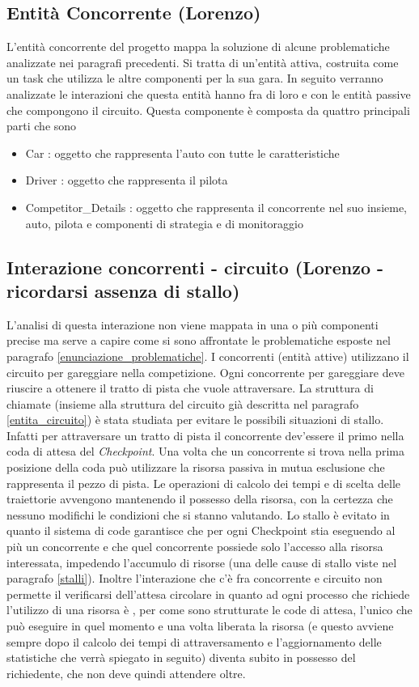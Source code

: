 \subsection{Entit\`{a} Concorrente (Lorenzo)}
L'entità concorrente del progetto mappa la soluzione di alcune problematiche analizzate nei paragrafi precedenti. Si tratta di un'entità attiva, costruita come un task che utilizza le altre componenti per la sua gara. In seguito verranno analizzate le interazioni che questa entità hanno fra di loro e con le entità passive che compongono il circuito.
Questa componente è composta da quattro principali parti che sono
\begin{itemize}
\item Car : oggetto che rappresenta l'auto con tutte le caratteristiche
\item Driver : oggetto che rappresenta il pilota
\item Competitor\_Details : oggetto che rappresenta il concorrente nel suo insieme, auto, pilota e componenti di strategia e di monitoraggio
\end{itemize}
\subsection{Interazione concorrenti - circuito (Lorenzo - ricordarsi assenza di stallo)}
L'analisi di questa interazione non viene mappata in una o più componenti precise ma serve a capire come si sono affrontate le problematiche esposte nel paragrafo \ref{enunciazione_problematiche}. I concorrenti (entità attive) utilizzano il circuito per gareggiare nella competizione.
Ogni concorrente per gareggiare deve riuscire a ottenere il tratto di pista che vuole attraversare. La struttura di chiamate (insieme alla struttura del circuito già descritta nel paragrafo \ref{entita_circuito}) è stata studiata per evitare le possibili situazioni di stallo. Infatti per attraversare un tratto di pista il concorrente dev'essere il primo nella coda di attesa del \emph{Checkpoint}. Una volta che un concorrente si trova nella prima posizione della coda può utilizzare la risorsa passiva in mutua esclusione che rappresenta il pezzo di pista. Le operazioni di calcolo dei tempi e di scelta delle traiettorie avvengono mantenendo il possesso della risorsa, con la certezza che nessuno modifichi le condizioni che si stanno valutando. Lo stallo è evitato in quanto il sistema di code garantisce che per ogni Checkpoint stia eseguendo al più un concorrente e che quel concorrente possiede solo l'accesso alla risorsa interessata, impedendo l'accumulo di risorse (una delle cause di stallo viste nel paragrafo \ref{stalli}). Inoltre l'interazione che c'è fra concorrente e circuito non permette il verificarsi dell'attesa circolare in quanto ad ogni processo che richiede l'utilizzo di una risorsa è , per come sono strutturate le code di attesa, l'unico che può eseguire in quel momento e una volta liberata la risorsa (e questo avviene sempre dopo il calcolo dei tempi di attraversamento e l'aggiornamento delle statistiche che verrà spiegato in seguito) diventa subito in possesso del richiedente, che non deve quindi attendere oltre. 
